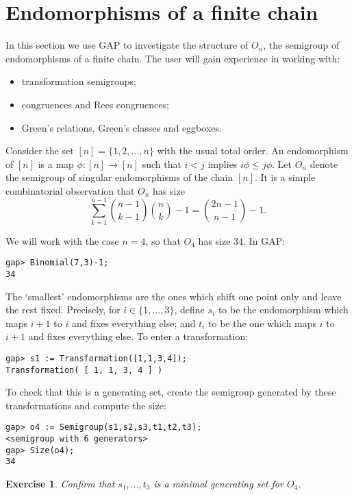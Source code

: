 \documentclass[12pt]{article}
\theoremstyle{plain} \newtheorem{Thm}{Theorem}
\theoremstyle{plain} \newtheorem{Cor}{Corollary}
\theoremstyle{plain} \newtheorem{Lemma}{Lemma}
\theoremstyle{plain} \newtheorem{Prop}{Proposition}
\theoremstyle{plain} \newtheorem{Ex}{Exercise}
\def\gap{\sf GAP}
\begin{document}
\section{Endomorphisms of a finite chain}
In this section we use {\gap} to investigate the structure of 
$O_n$, the semigroup of endomorphisms of a finite chain.  
The user will gain experience in working with:
\begin{itemize}
\item transformation semigroups;
\item congruences and Rees congruences;
\item Green's relations, Green's classes and eggboxes.
\end{itemize}


Consider the set $[n] = \{1, 2, \ldots, n\}$ with the usual total order. 
An endomorphism of $[n]$ is a map $\phi: [n] \rightarrow [n]$ 
such that  $i < j$ implies $i\phi \leq j\phi$. Let $O_n$ denote
the semigroup of singular endomorphisms of the chain $[n]$.
It is a simple combinatorial observation \cite{tgl94} that $O_n$ has size
$$\sum_{k=1}^{n-1} \binom{n-1}{k-1} \binom{n}{k} - 1 = \binom{2n-1}{n-1} -1.$$

We will work with the case $n=4$, so that $O_4$ has size $34$. 
In {\gap}:
\begin{verbatim}
gap> Binomial(7,3)-1;
34
\end{verbatim}


The `smallest' endomorphisms are the ones 
which shift one point only and leave the rest fixed. Precisely,
for $i \in \{1, \ldots, 3\}$, define 
$s_i$ to be the endomorphism  which maps $i+1$ to $i$ and 
fixes everything else; and $t_i$ to be the one which maps 
$i$ to $i+1$ and fixes everything
else.  To enter a transformation: 
\begin{verbatim}
gap> s1 := Transformation([1,1,3,4]);
Transformation( [ 1, 1, 3, 4 ] )
\end{verbatim}

To check that this is a generating set,
create the semigroup generated by these transformations
and compute the size:
\begin{verbatim}
gap> o4 := Semigroup(s1,s2,s3,t1,t2,t3);
<semigroup with 6 generators>
gap> Size(o4);
34
\end{verbatim}
\begin{Ex}
Confirm that $s_1, \ldots, t_3$ is a minimal generating set for $O_4$.
\end{Ex}
\end{document}
